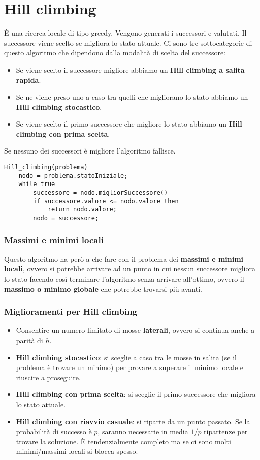 \section{Hill climbing}
\`E una ricerca locale di tipo greedy. Vengono generati i successori e valutati. Il successore
viene scelto se migliora lo stato attuale. Ci sono tre sottocategorie di questo algoritmo che
dipendono dalla modalit\`a di scelta del successore:
\begin{itemize}
	\item Se viene scelto il successore migliore abbiamo un \textbf{Hill climbing a salita rapida}.
	\item Se ne viene preso uno a caso tra quelli che migliorano lo stato abbiamo un
	      \textbf{Hill climbing stocastico}.
	\item Se viene scelto il primo successore che migliore lo stato abbiamo un
	      \textbf{Hill climbing con prima scelta}.
\end{itemize}
Se nessuno dei successori \`e migliore l'algoritmo fallisce.

\begin{lstlisting}[style=pseudo-style]
Hill_climbing(problema)
	nodo = problema.statoIniziale;
	while true
		successore = nodo.migliorSuccessore()
		if successore.valore <= nodo.valore then
			return nodo.valore;
		nodo = successore;
\end{lstlisting}

\subsubsection{Massimi e minimi locali}
Questo algoritmo ha per\`o a che fare con il problema dei \textbf{massimi e minimi locali}, ovvero
si potrebbe arrivare ad un punto in cui nessun successore migliora lo stato facendo cos\`i terminare
l'algoritmo senza arrivare all'ottimo, ovvero il \textbf{massimo o minimo globale} che potrebbe
trovarsi pi\`u avanti.

\subsubsection{Miglioramenti per Hill climbing}
\begin{itemize}
	\item Consentire un numero limitato di mosse \textbf{laterali}, ovvero si continua anche
	      a parit\`a di $h$.
	\item \textbf{Hill climbing stocastico}: si sceglie a caso tra le mosse in salita (se il problema
	      \`e trovare un minimo) per provare a superare il minimo locale e riuscire a proseguire.
	\item \textbf{Hill climbing con prima scelta}: si sceglie il primo successore che migliora lo stato
	      attuale.
	\item \textbf{Hill climbing con riavvio casuale}: si riparte da un punto passato. Se la probabilit\`a
	      di successo \`e $p$, saranno necessarie in media $1 / p$ ripartenze per trovare la soluzione.
	      \`E tendenzialmente completo ma se ci sono molti minimi/massimi locali si blocca spesso.
\end{itemize}

